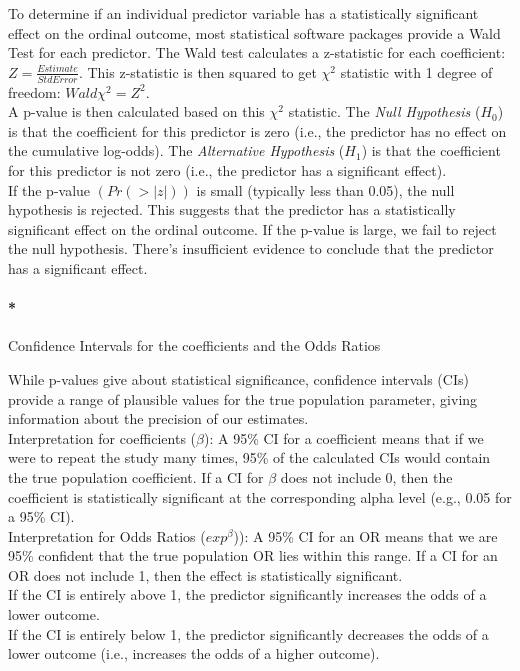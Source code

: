 \documentclass[
  letterpaper,
  DIV=11,
  numbers=noendperiod]{scrartcl}
\let\oldparagraph\paragraph
\renewcommand{\paragraph}[1]{\oldparagraph{#1}\mbox{}}
\begin{document}
To determine if an individual predictor variable has a statistically
significant effect on the ordinal outcome, most statistical software
packages provide a Wald Test for each predictor. The Wald test
calculates a z-statistic for each coefficient:
\(Z= \frac{Estimate}{Std Error}\). This z-statistic is then squared to
get \(\chi^2\) statistic with 1 degree of freedom:
\(Wald\chi^2 = Z^2\).\\
A p-value is then calculated based on this \(\chi^2\) statistic. The
\emph{Null Hypothesis} (\(H_0\)) is that the coefficient for this
predictor is zero (i.e., the predictor has no effect on the cumulative
log-odds). The \emph{Alternative Hypothesis} (\(H_1\)) is that the
coefficient for this predictor is not zero (i.e., the predictor has a
significant effect).\\
If the p-value \((Pr(>|z|))\) is small (typically less than 0.05), the
null hypothesis is rejected. This suggests that the predictor has a
statistically significant effect on the ordinal outcome. If the p-value
is large, we fail to reject the null hypothesis. There's insufficient
evidence to conclude that the predictor has a significant effect.

\hypertarget{confidence-intervals-for-the-coefficients-and-the-odds-ratios}{%
\paragraph*{Confidence Intervals for the coefficients and the Odds
Ratios}\label{confidence-intervals-for-the-coefficients-and-the-odds-ratios}}

While p-values give about statistical significance, confidence intervals
(CIs) provide a range of plausible values for the true population
parameter, giving information about the precision of our estimates.\\
Interpretation for coefficients (\(\beta\)): A 95\% CI for a coefficient
means that if we were to repeat the study many times, 95\% of the
calculated CIs would contain the true population coefficient. If a CI
for \(\beta\) does not include 0, then the coefficient is statistically
significant at the corresponding alpha level (e.g., 0.05 for a 95\%
CI).\\
Interpretation for Odds Ratios (\(exp^\beta\))): A 95\% CI for an OR
means that we are 95\% confident that the true population OR lies within
this range. If a CI for an OR does not include 1, then the effect is
statistically significant.\\
If the CI is entirely above 1, the predictor significantly increases the
odds of a lower outcome.\\
If the CI is entirely below 1, the predictor significantly decreases the
odds of a lower outcome (i.e., increases the odds of a higher outcome).
\end{document}
